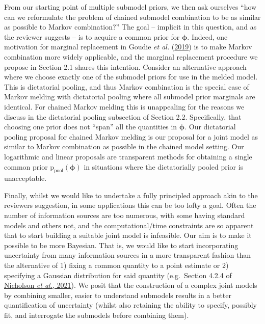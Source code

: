 \documentclass[
  10pt,
  a4paper,
]{article}
\newcommand{\pd}{\text{p}}
\begin{document}
From our starting point of multiple submodel priors, we then ask
ourselves ``how can we reformulate the problem of chained submodel
combination to be as similar as possible to Markov combination?'' The
goal -- implicit in this question, and as the reviewer suggests -- is to
acquire a common prior for \(\boldsymbol{\phi}\). Indeed, one motivation
for marginal replacement in Goudie \emph{et al.}
(\protect\hyperlink{ref-goudie_joining_2019}{2019}) is to make Markov
combination more widely applicable, and the marginal replacement
procedure we propose in Section 2.1 shares this intention. Consider an
alternative approach where we choose exactly one of the submodel priors
for use in the melded model. This is dictatorial pooling, and thus
Markov combination is the special case of Markov melding with
dictatorial pooling where all submodel prior marginals are identical.
For chained Markov melding this is unappealing for the reasons we
discuss in the dictatorial pooling subsection of Section 2.2.
Specifically, that choosing one prior does not ``span'' all the
quantities in \(\boldsymbol{\phi}\). Our dictatorial pooling proposal
for chained Markov melding is our proposal for a joint model as similar
to Markov combination as possible in the chained model setting. Our
logarithmic and linear proposals are transparent methods for obtaining a
single common prior \(\pd_{\text{pool}}(\boldsymbol{\phi})\) in
situations where the dictatorially pooled prior is unacceptable.

Finally, whilst we would like to undertake a fully principled approach
akin to the reviewers suggestion, in some applications this can be too
lofty a goal. Often the number of information sources are too numerous,
with some having standard models and others not, and the
computational/time constraints are so apparent that to start building a
suitable joint model is infeasible. Our aim is to make it possible to be
more Bayesian. That is, we would like to start incorporating uncertainty
from many information sources in a more transparent fashion than the
alternative of 1) fixing a common quantity to a point estimate or 2)
specifying a Gaussian distribution for said quantity (e.g.~Section 4.2.4
of \protect\hyperlink{ref-nicholson_interoperability_2021}{Nicholson
\emph{et al.}, 2021}). We posit that the construction of a complex joint
models by combining smaller, easier to understand submodels results in a
better quantification of uncertainty (whilst also retaining the ability
to specify, possibly fit, and interrogate the submodels before combining
them).
\end{document}
